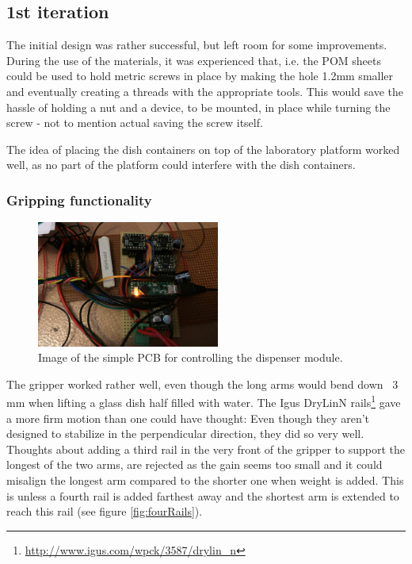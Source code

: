 \documentclass[10pt,a4paper]{article}
\begin{document}
	
	\subsection{1st iteration}
	The initial design was rather successful, but left room for some improvements. During the use of the materials, it was experienced that, i.e. the POM sheets could be used to hold metric screws in place by making the hole 1.2mm smaller and eventually creating a threads with the appropriate tools. This would save the hassle of holding a nut and a device, to be mounted, in place while turning the screw - not to mention actual saving the screw itself.
	
	The idea of placing the dish containers on top of the laboratory platform worked well, as no part of the platform could interfere with the dish containers.
	
		\subsubsection{Gripping functionality}
			\begin{figure}
				\includegraphics[width=6cm]{images/pcb.png}
				\caption{Image of the simple PCB for controlling the dispenser module.}
				\label{fig:pcb}
			\end{figure}
			
			The gripper worked rather well, even though the long arms would bend down ~3 mm when lifting a glass dish half filled with water. The Igus DryLin\textregistered N rails\footnote{\url{http://www.igus.com/wpck/3587/drylin_n}} gave a more firm motion than one could have thought: Even though they aren't designed to stabilize in the perpendicular direction, they did so very well. Thoughts about adding a third rail in the very front of the gripper to support the longest of the two arms, are rejected as the gain seems too small and it could misalign the longest arm compared to the shorter one when weight is added. This is unless a fourth rail is added farthest away and the shortest arm is extended to reach this rail (see figure \ref{fig:fourRails}).
		
\end{document}
